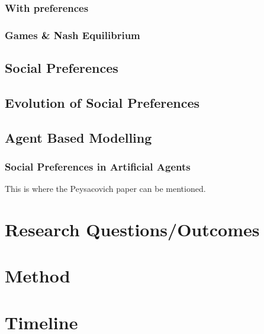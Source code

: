 \documentclass{article}
\begin{document}
\subsubsection{With preferences}
\subsubsection{Games \& Nash Equilibrium}
\subsection{Social Preferences}
\subsection{Evolution of Social Preferences}
\subsection{Agent Based Modelling}
\subsubsection{Social Preferences in Artificial Agents}
This is where the Peysacovich paper can be mentioned.
\section{Research Questions/Outcomes}
\section{Method}
\section{Timeline}


\end{document}
